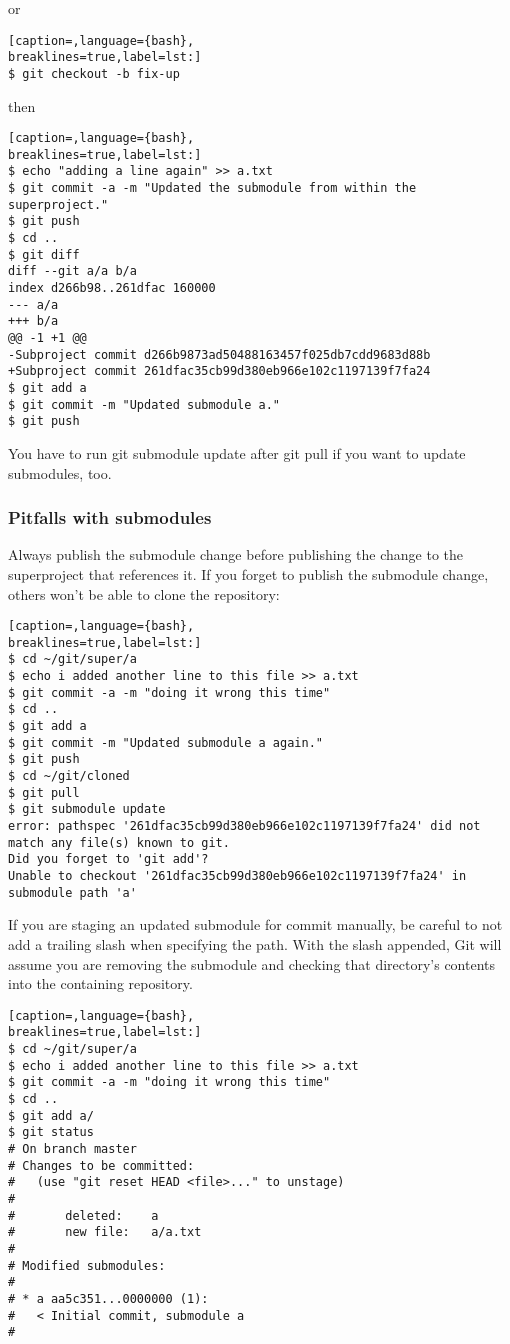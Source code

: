 or
\lstset{basicstyle=\scriptsize, numbers=none, captionpos=b, tabsize=4}
\begin{lstlisting}[caption=,language={bash},
breaklines=true,label=lst:]
$ git checkout -b fix-up
\end{lstlisting}

then
\lstset{basicstyle=\scriptsize, numbers=none, captionpos=b, tabsize=4}
\begin{lstlisting}[caption=,language={bash},
breaklines=true,label=lst:]
$ echo "adding a line again" >> a.txt
$ git commit -a -m "Updated the submodule from within the superproject."
$ git push
$ cd ..
$ git diff
diff --git a/a b/a
index d266b98..261dfac 160000
--- a/a
+++ b/a
@@ -1 +1 @@
-Subproject commit d266b9873ad50488163457f025db7cdd9683d88b
+Subproject commit 261dfac35cb99d380eb966e102c1197139f7fa24
$ git add a
$ git commit -m "Updated submodule a."
$ git push
\end{lstlisting}

You have to run git submodule update after git pull if you want to update
submodules, too.

\subsubsection{Pitfalls with submodules}
Always publish the submodule change before publishing the change to the
superproject that references it. If you forget to publish the submodule change,
others won't be able to clone the repository:
\lstset{basicstyle=\scriptsize, numbers=none, captionpos=b, tabsize=4}
\begin{lstlisting}[caption=,language={bash},
breaklines=true,label=lst:]
$ cd ~/git/super/a
$ echo i added another line to this file >> a.txt
$ git commit -a -m "doing it wrong this time"
$ cd ..
$ git add a
$ git commit -m "Updated submodule a again."
$ git push
$ cd ~/git/cloned
$ git pull
$ git submodule update
error: pathspec '261dfac35cb99d380eb966e102c1197139f7fa24' did not match any file(s) known to git.
Did you forget to 'git add'?
Unable to checkout '261dfac35cb99d380eb966e102c1197139f7fa24' in submodule path 'a'
\end{lstlisting}

If you are staging an updated submodule for commit manually, be careful to not
add a trailing slash when specifying the path. With the slash appended, Git
will assume you are removing the submodule and checking that directory's
contents into the containing repository.
\lstset{basicstyle=\scriptsize, numbers=none, captionpos=b, tabsize=4}
\begin{lstlisting}[caption=,language={bash},
breaklines=true,label=lst:]
$ cd ~/git/super/a
$ echo i added another line to this file >> a.txt
$ git commit -a -m "doing it wrong this time"
$ cd ..
$ git add a/
$ git status
# On branch master
# Changes to be committed:
#   (use "git reset HEAD <file>..." to unstage)
#
#       deleted:    a
#       new file:   a/a.txt
#
# Modified submodules:
#
# * a aa5c351...0000000 (1):
#   < Initial commit, submodule a
#
\end{lstlisting}

